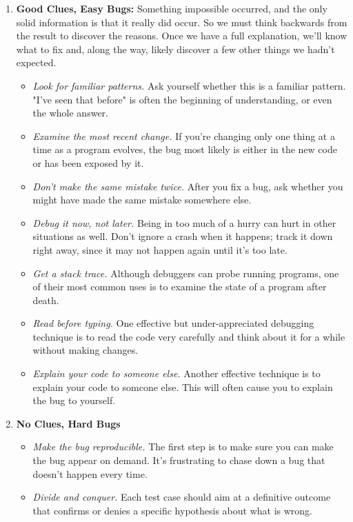 \documentclass[draftclsnofoot,journal,onecolumn,12pt]{IEEEtran}
\begin{document}
\begin{enumerate}
  \item \textbf{Good Clues, Easy Bugs:} Something impossible occurred, and the only solid information is that it really did occur.
So we must think backwards from the result to discover the reasons. Once we have a full explanation, we'll know what to fix and, along the way, likely discover a few other things we hadn't expected.
\begin{itemize}
  \item \textit{Look for familiar patterns.} Ask yourself whether this is a familiar pattern. "I've seen that before" is often the beginning of understanding, or even the whole answer.
  \item \textit{Examine the most recent change.} If you're changing only one thing at a time as a program evolves, the bug most likely is either in the new code or has been exposed by it.
  \item \textit{Don't make the same mistake twice.} After you fix a bug, ask whether you might have made the same mistake somewhere else.
  \item \textit{Debug it now, not later.} Being in too much of a hurry can hurt in other situations as well. Don't ignore a crash when it happens; track it down right away, since it may not happen again until it's too late.
  \item \textit{Get a stack trace.} Although debuggers can probe running programs, one of their most common uses is to examine the state of a program after death.
  \item \textit{Read before typing.} One effective but under-appreciated debugging technique is to read the code very carefully and think about it for a while without making changes.
  \item \textit{Explain your code to someone else.} Another effective technique is to explain your code to somcone else. This will often cause you to explain the bug to yourself.
\end{itemize}
  \item \textbf{No Clues, Hard Bugs}
  \begin{itemize}
    \item \textit{Make the bug reproducible.} The first step is to make sure you can make the bug appear on demand. It's frustrating to chase down a bug that doesn't happen every time.
    \item \textit{Divide and conquer.} Each test case should aim at a definitive outcome that confirms or denies a specific hypothesis about what is wrong.

\end{itemize}
\end{enumerate}
\end{document}
